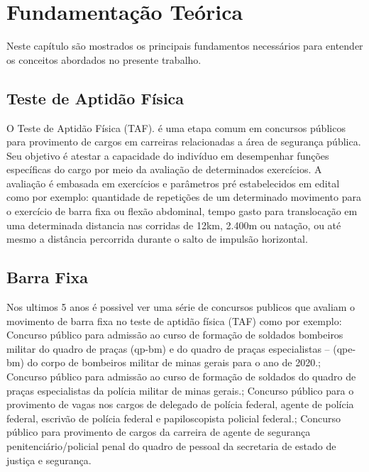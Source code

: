 \chapter{Fundamentação Teórica}

Neste capítulo são mostrados os principais fundamentos necessários para entender os
conceitos abordados no presente trabalho.

\section[TAF]{Teste de Aptidão Física}


O Teste de Aptidão Física (TAF). é uma etapa comum em concursos públicos para provimento de cargos em carreiras relacionadas a área de segurança pública. Seu objetivo é atestar a capacidade do indivíduo em desempenhar funções específicas do cargo por meio da avaliação de determinados exercícios. A avaliação é embasada em exercícios e parâmetros pré estabelecidos em edital como por exemplo: quantidade de repetições de um determinado movimento para o exercício de barra fixa ou flexão abdominal, tempo gasto para translocação em uma determinada distancia nas corridas de 12km, 2.400m ou natação, ou até mesmo a distância percorrida durante o salto de impulsão horizontal.


\section[Barra Fixa]{Barra Fixa}

Nos ultimos 5 anos é possivel ver uma série de concursos publicos que avaliam o movimento de barra fixa no teste de aptidão física (TAF) como por exemplo:
Concurso público para admissão ao curso de formação de soldados bombeiros militar do quadro de praças (qp-bm) e do quadro de praças especialistas – (qpe-bm) do corpo de bombeiros militar de minas gerais para o ano de 2020.\cite{eCBMG2018};
Concurso público para admissão ao curso de formação de soldados do quadro de praças especialistas da polícia militar de minas gerais.\cite{ePMMG2021};
Concurso público para o provimento de vagas nos cargos de delegado de polícia federal, agente de polícia federal, escrivão de polícia federal e papiloscopista policial federal.\cite{ePF2021};
Concurso público para provimento de cargos da carreira de agente de segurança penitenciário/policial penal do quadro de pessoal da secretaria de estado de justiça e segurança\cite{ePP2021}.

